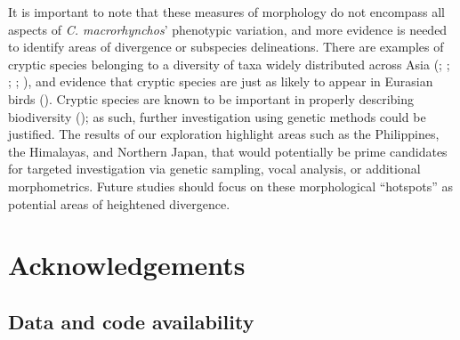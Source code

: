 \documentclass[10pt,a4paper]{article}
\begin{document}
It is important to note that these measures of morphology do not encompass all aspects of \emph{C. macrorhynchos}' phenotypic variation, and more evidence is needed to identify areas of divergence or subspecies delineations.
There are examples of cryptic species belonging to a diversity of taxa widely distributed across Asia (; ; ; ; ), and evidence that cryptic species are just as likely to appear in Eurasian birds ().
Cryptic species are known to be important in properly describing biodiversity (); as such, further investigation using genetic methods could be justified.
The results of our exploration highlight areas such as the Philippines, the Himalayas, and Northern Japan, that would potentially be prime candidates for targeted investigation via genetic sampling, vocal analysis, or additional morphometrics.
Future studies should focus on these morphological ``hotspots'' as potential areas of heightened divergence.

\section{Acknowledgements}\label{acknowledgements}

\subsection{Data and code availability}\label{data-and-code-availability}
\end{document}
